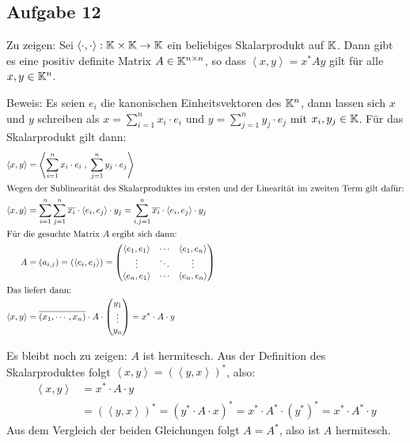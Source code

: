 \subsection*{Aufgabe 12}
Zu zeigen: Sei $\left<\cdot , \cdot \right>: \mathbb K\times\mathbb K \rightarrow \mathbb K$ ein beliebiges
Skalarprodukt auf $\mathbb K$. Dann gibt es eine positiv definite Matrix $A \in \mathbb K^{n \times n}$,
so dass $\left<x,y\right> = x^* A y$ gilt für alle $x,y \in \mathbb K^n$.

Beweis: Es seien $e_i$ die kanonischen Einheitsvektoren des $\mathbb K^n$, dann lassen
sich $x$ und $y$ schreiben als $x = \sum_{i = 1}^n x_i \cdot e_i$ und
$y = \sum_{j = 1}^n y_j \cdot e_j$ mit $x_i, y_j \in \mathbb K$. Für das Skalarprodukt
gilt dann:
\begin{align}
  \nonumber
  \left<x,y\right> &= \left< \sum_{i = 1}^n x_i \cdot e_i \;,\; \sum_{j = 1}^n y_j \cdot e_j \right> \\
  \intertext{Wegen der Sublinearität des Skalarproduktes im ersten und der Linearität im zweiten Term gilt dafür:}
  \nonumber
  \left<x,y\right>  &=  \sum_{i = 1}^n \sum_{j = 1}^n \overline{x_i} \cdot \left<e_i,e_j\right> \cdot  y_j
  =\sum_{i, j = 1}^n  \overline{x_i} \cdot \left<e_i,e_j\right> \cdot y_j\\
  \intertext{Für die gesuchte Matrix $A$ ergibt sich dann:}
  \nonumber
  A &= (a_{i,j}) = (\left<e_i,e_j\right>) =
   \begin{pmatrix}
     \left<e_1,e_1\right> & \cdots & \left<e_1,e_n\right>\\
     \vdots & \ddots & \vdots \\
     \left<e_n,e_1\right> & \cdots & \left<e_n,e_n\right>
   \end{pmatrix}
  \\
  \intertext{Das liefert dann:}
  \label{eq-12a}
  \left<x,y\right>  &=  \overline{(x_1, \cdots, x_n)} \cdot A \cdot
    \begin{pmatrix} y_1 \\ \vdots \\ y_n \end{pmatrix} = x^* \cdot A \cdot y
\end{align}

Es bleibt noch zu zeigen: $A$ ist hermitesch. Aus der Definition des Skalarproduktes
folgt $\left<x,y\right> = (\left<y,x\right>)^*$, also:
\begin{align*}
\left<x,y\right> &= x^* \cdot A \cdot y\\
   &= (\left<y,x\right>)^* = (y^* \cdot A  \cdot x)^* = x^*  \cdot A^*  \cdot (y^*)^*
   = x^* \cdot A^* \cdot y
\end{align*}
Aus dem Vergleich der beiden Gleichungen folgt $A = A^*$, also ist $A$ hermitesch.

